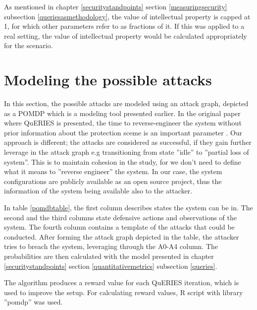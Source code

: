 As mentioned in chapter \ref{securitystandpoints} section
\ref{measuringsecurity} subsection \ref{queriesasmethodology}, the
value of intellectual property is capped at 1, for which other
parameters refer to as fractions of it. If this was applied to a real
setting, the value of intellectual property would be calculated
appropriately for the scenario.

\section{Modeling the possible attacks}

In this section, the possible attacks are modeled using an attack
graph, depicted as a POMDP which is a modeling tool presented
earlier. In the original paper where QuERIES is presented, the time to
reverse-engineer the system without prior information about the
protection sceme is an important parameter
\cite{carin2008cybersecurity}. Our approach is different; the attacks
are considered as successful, if they gain further leverage in the
attack graph e.g transitioning from state ''idle'' to ''partial loss of
system''. This is to maintain cohesion in the study, for we don't need
to define what it means to ''reverse engineer'' the system. In our
case, the system configurations are publicly available as an open source
project, thus the information of the system being available also to
the attacker.

In table \ref{pomdbtable}, the first column describes states the
system can be in. The second and the third columns state defensive
actions and observations of the system. The fourth column contains a
template of the attacks that could be conducted. After forming the
attack graph depicted in the table, the attacker tries to breach the
system, leveraging through the A0-A4 column. The probabilities are
then calculated with the model presented in chapter
\ref{securitystandpoints} section \ref{quantitativemetrics} subsection
\ref{queries}.

The algorithm produces a reward value for each QuERIES iteration,
which is used to improve the setup. For calculating reward values, R
script with library ''pomdp'' was used.

